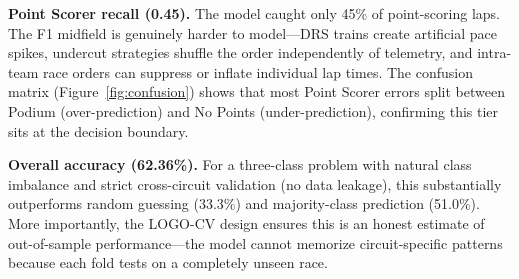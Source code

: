 \textbf{Point Scorer recall (0.45).} The model caught only 45\% of
point-scoring laps. The F1 midfield is genuinely harder to model---DRS
trains create artificial pace spikes, undercut strategies shuffle the order
independently of telemetry, and intra-team race orders can suppress or
inflate individual lap times. The confusion matrix (Figure~\ref{fig:confusion})
shows that most Point Scorer errors split between Podium (over-prediction)
and No Points (under-prediction), confirming this tier sits at the decision
boundary.

\textbf{Overall accuracy (62.36\%).} For a three-class problem with natural
class imbalance and strict cross-circuit validation (no data leakage), this
substantially outperforms random guessing (33.3\%) and majority-class
prediction (51.0\%). More importantly, the LOGO-CV design ensures this is an
honest estimate of out-of-sample performance---the model cannot memorize
circuit-specific patterns because each fold tests on a completely unseen
race.
